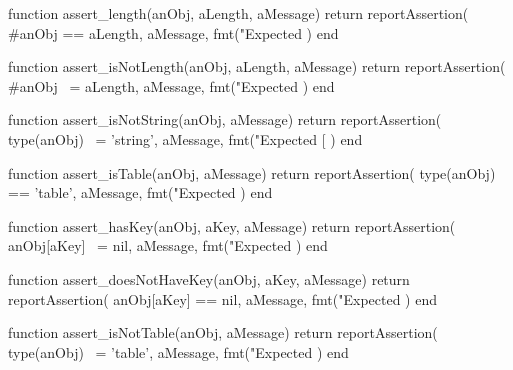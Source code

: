 \startTestSuite[title=assert_length]

\startLuaCode
function assert_length(anObj, aLength, aMessage)
  return reportAssertion(
    #anObj == aLength,
    aMessage,
    fmt("Expected %
  )
end
\stopLuaCode

\stopTestSuite

\startTestSuite[title=assert_isNotLength]

\startLuaCode
function assert_isNotLength(anObj, aLength, aMessage)
  return reportAssertion(
    #anObj ~= aLength,
    aMessage,
    fmt("Expected %
  )
end
\stopLuaCode

\stopTestSuite

\startTestSuite[title=assert_isNotString]

\startLuaCode
function assert_isNotString(anObj, aMessage)
  return reportAssertion(
    type(anObj) ~= 'string',
    aMessage,
    fmt("Expected [%
  )
end
\stopLuaCode

\stopTestSuite

\startTestSuite[title=assert_isTable]

\startLuaCode
function assert_isTable(anObj, aMessage)
  return reportAssertion(
    type(anObj) == 'table',
    aMessage,
    fmt("Expected %
  )
end
\stopLuaCode

\stopTestSuite

\startTestSuite[title=assert_hasKey]

\startLuaCode
function assert_hasKey(anObj, aKey, aMessage)
  return reportAssertion(
    anObj[aKey] ~= nil,
    aMessage,
    fmt("Expected %
  )
end
\stopLuaCode

\stopTestSuite

\startTestSuite[title=assert_doesNotHaveKey]

\startLuaCode
function assert_doesNotHaveKey(anObj, aKey, aMessage)
  return reportAssertion(
    anObj[aKey] == nil,
    aMessage,
    fmt("Expected %
  )
end
\stopLuaCode

\stopTestSuite

\startTestSuite[title=assert_isNotTable]

\startLuaCode
function assert_isNotTable(anObj, aMessage)
  return reportAssertion(
    type(anObj) ~= 'table',
    aMessage,
    fmt("Expected %
  )
end
\stopLuaCode

